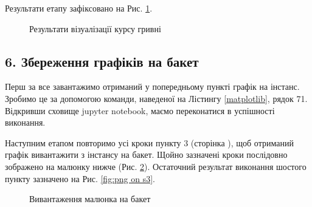 \documentclass[a4paper,14pt]{extarticle} %
\begin{document}
Результати етапу зафіксовано на Рис. \ref{fig:currency}.

\begin{figure}[H]
    \caption{Результати візуалізації курсу гривні}
    \label{fig:currency}
\end{figure}

\subsection*{6. Збереження графіків на бакет}

Перш за все завантажимо отриманий у попередньому пункті графік на інстанс. Зробимо це за допомогою команди, 
наведеної на Лістингу \ref{matplotlib}, рядок 71. Відкривши сховище jupyter notebook, маємо переконатися в 
успішності виконання. 

Наступним етапом повторимо усі кроки пункту 3 (сторінка \pageref{section 5}), щоб отриманий графік вивантажити 
з інстансу на бакет. Щойно зазначені кроки послідовно зображено на малюнку нижче (Рис. \ref{fig:copy .png to bucket}).
Остаточний результат виконання шостого пункту зазначено на Рис. \ref{fig:png on s3}.

\begin{figure}[H]
    \caption{Вивантаження малюнка на бакет}
    \label{fig:copy .png to bucket}
\end{figure}
\end{document}
